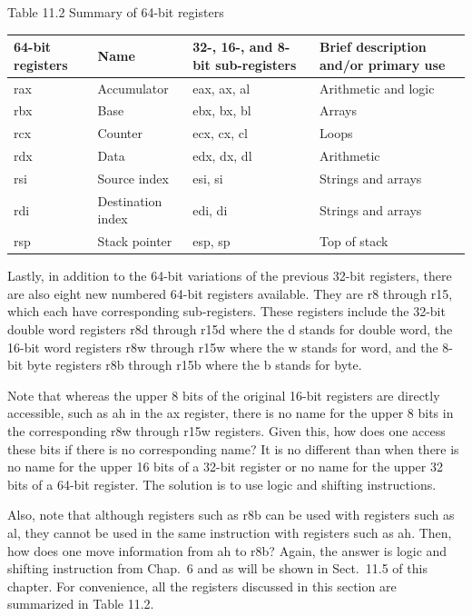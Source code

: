 \documentclass[10pt]{book}
\begin{document}
Table 11.2 Summary of 64-bit registers
\begin{table}[h]
\centering
\begin{tabular}{|l|l|l|l|}
\hline
64-bit registers & Name & 32-, 16-, and 8-bit sub-registers & Brief description and/or primary use \\
\hline
rax & Accumulator & eax, ax, al & Arithmetic and logic \\
\hline
rbx & Base & ebx, bx, bl & Arrays \\
\hline
rcx & Counter & ecx, cx, cl & Loops \\
\hline
rdx & Data & edx, dx, dl & Arithmetic \\
\hline
rsi & Source index & esi, si & Strings and arrays \\
\hline
rdi & Destination index & edi, di & Strings and arrays \\
\hline
rsp & Stack pointer & esp, sp & Top of stack \\
\hline
\end{tabular}
\end{table}

Lastly, in addition to the 64-bit variations of the previous 32-bit registers, there are also eight new numbered 64-bit registers available. They are r8 through r15, which each have corresponding sub-registers. These registers include the 32-bit double word registers r8d through r15d where the d stands for double word, the 16-bit word registers r8w through r15w where the w stands for word, and the 8-bit byte registers r8b through r15b where the b stands for byte.

Note that whereas the upper 8 bits of the original 16-bit registers are directly accessible, such as ah in the ax register, there is no name for the upper 8 bits in the corresponding r8w through r15w registers. Given this, how does one access these bits if there is no corresponding name? It is no different than when there is no name for the upper 16 bits of a 32-bit register or no name for the upper 32 bits of a 64-bit register. The solution is to use logic and shifting instructions.

Also, note that although registers such as r8b can be used with registers such as al, they cannot be used in the same instruction with registers such as ah. Then, how does one move information from ah to r8b? Again, the answer is logic and shifting instruction from Chap.~6 and as will be shown in Sect.~11.5 of this chapter. For convenience, all the registers discussed in this section are summarized in Table 11.2.
\end{document}
